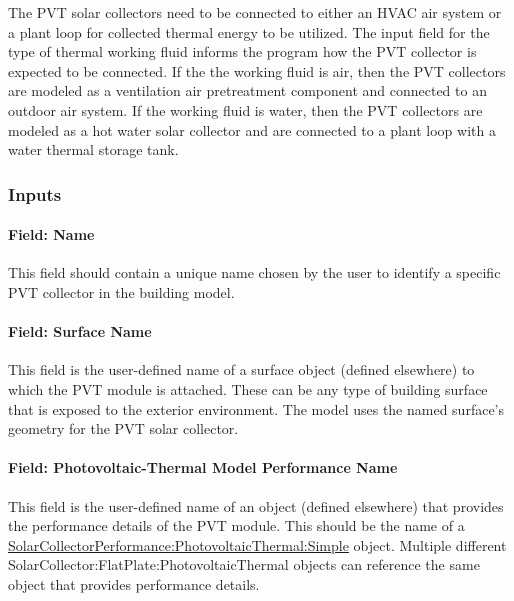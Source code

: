 The PVT solar collectors need to be connected to either an HVAC air system or a plant loop for collected thermal energy to be utilized. The input field for the type of thermal working fluid informs the program how the PVT collector is expected to be connected. If the the working fluid is air, then the PVT collectors are modeled as a ventilation air pretreatment component and connected to an outdoor air system. If the working fluid is water, then the PVT collectors are modeled as a hot water solar collector and are connected to a plant loop with a water thermal storage tank.

\subsubsection{Inputs}\label{inputs-4-032}

\paragraph{Field: Name}\label{field-name-4-027}

This field should contain a unique name chosen by the user to identify a specific PVT collector in the building model.

\paragraph{Field: Surface Name}\label{field-surface-name-2-001}

This field is the user-defined name of a surface object (defined elsewhere) to which the PVT module is attached. These can be any type of building surface that is exposed to the exterior environment. The model uses the named surface's geometry for the PVT solar collector.

\paragraph{Field: Photovoltaic-Thermal Model Performance Name}\label{field-photovoltaic-thermal-model-performance-name}

This field is the user-defined name of an object (defined elsewhere) that provides the performance details of the PVT module. This should be the name of a \hyperref[solarcollectorperformancephotovoltaicthermalsimple]{SolarCollectorPerformance:PhotovoltaicThermal:Simple} object. Multiple different SolarCollector:FlatPlate:PhotovoltaicThermal objects can reference the same object that provides performance details.

